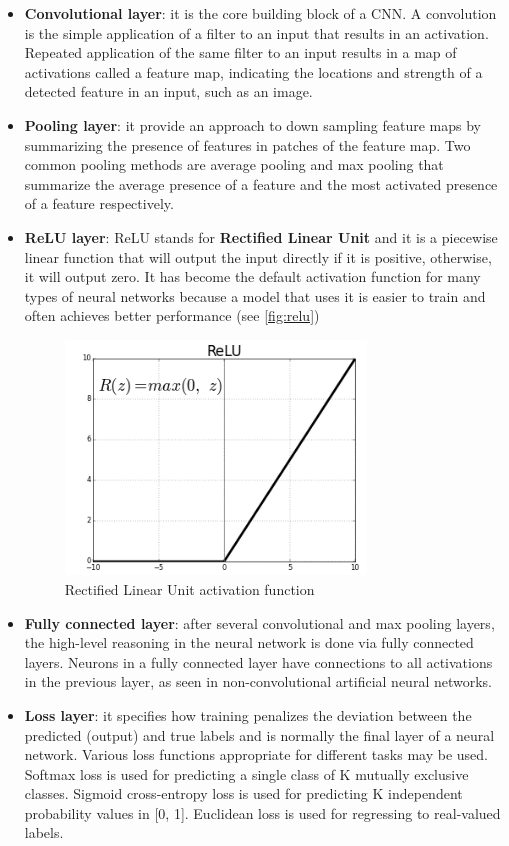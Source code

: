 \begin{itemize}
    \item \textbf{Convolutional layer}: it is the core building block of a CNN\@.
        A convolution is the simple application of a filter to an input that
        results in an activation. Repeated application of the same filter to an
        input results in a map of activations called a feature map, indicating
        the locations and strength of a detected feature in an input, such as
        an image.
    \item \textbf{Pooling layer}: it provide an approach to down sampling
        feature maps by summarizing the presence of features in patches of the
        feature map. Two common pooling methods are average pooling and max
        pooling that summarize the average presence of a feature and the most
        activated presence of a feature respectively.
    \item \textbf{ReLU layer}: ReLU stands for \textbf{Rectified Linear Unit}
        and it is a piecewise linear function that will output the input
        directly if it is positive, otherwise, it will output zero. It has
        become the default activation function for many types of neural
        networks because a model that uses it is easier to train and often
        achieves better performance (see \autoref{fig:relu})
\begin{figure}[ht]
    \includegraphics[width=8cm]{images/pruning/relu.png}
    \centering
    \caption{Rectified Linear Unit activation function}\label{fig:relu}
\end{figure}
    \item \textbf{Fully connected layer}: after several convolutional and max
        pooling layers, the high-level reasoning in the neural network is done
        via fully connected layers. Neurons in a fully connected layer have
        connections to all activations in the previous layer, as seen in
        non-convolutional artificial neural networks.
    \item \textbf{Loss layer}: it specifies how training penalizes the
        deviation between the predicted (output) and true labels and is
        normally the final layer of a neural network. Various loss functions
        appropriate for different tasks may be used. Softmax loss is used for
        predicting a single class of K mutually exclusive classes.
        Sigmoid cross-entropy loss is used for predicting K independent
        probability values in [0, 1]. Euclidean loss is used for regressing to
        real-valued labels.\cite{cnn}
\end{itemize}

